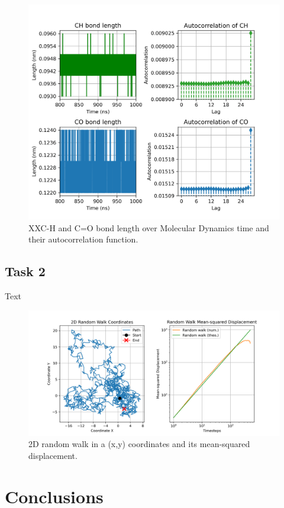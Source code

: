 \documentclass{article}
\begin{document}
\begin{figure}[H]
\includegraphics[width=\linewidth]{CO_CH_length_acf_plot.png}
\caption{XXC-H and C=O bond length over Molecular Dynamics time and their autocorrelation function.}
\label{acf_plot}
\end{figure}




\subsection{Task 2}


Text

\begin{figure}[H]
\includegraphics[width=\linewidth]{msd_plot.png}
\caption{2D random walk in a (x,y) coordinates and its mean-squared displacement.}
\label{msd_plot}
\end{figure}



\section{Conclusions}



\end{document}
